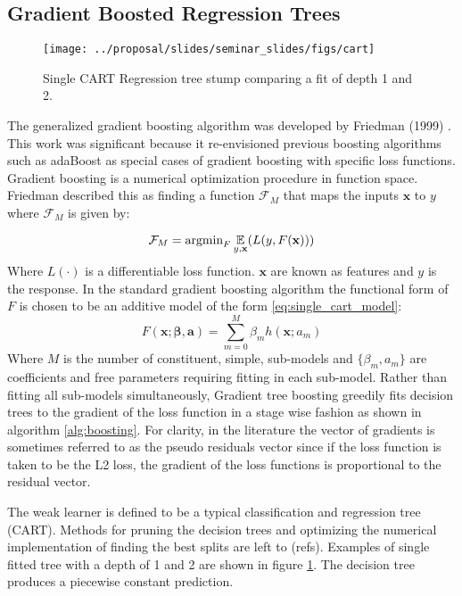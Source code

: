 \subsection{Gradient Boosted Regression Trees}

\begin{figure}[H]
    \centering
    \texttt{[image: ../proposal/slides/seminar\_slides/figs/cart]}
    \caption[Regression tree stump.]{Single CART Regression tree stump comparing a fit of depth 1 and 2.}
    \label{fig:cart}
\end{figure}

The generalized gradient boosting algorithm was developed by Friedman (1999)  \cite{friedman2001}.  This work was significant because it re-envisioned previous boosting algorithms such as adaBoost as special cases of gradient boosting with specific loss functions.  Gradient boosting is a numerical optimization procedure in function space.  Friedman described this as finding a function $\mathcal F_M$ that maps the inputs $\mathbf x$ to $y$ where $\mathcal F_M$ is given by:

\begin{equation}
\mathcal F_M = \text{argmin}_F \operatorname*{\mathbb{E}}_{y, \mathbf x} (L(y, F(\mathbf x)))
\end{equation}
Where $L(\cdot)$ is a differentiable loss function.  $\mathbf x$ are known as features and $y$ is the response.  In the standard gradient boosting algorithm the functional form of $F$ is chosen to be an additive model of the form \ref{eq:single_cart_model}:
\begin{equation}
F(\mathbf x; \mathbf{\beta}, \mathbf a) = \sum_{m=0}^M \beta_m h(\mathbf x; a_m)
\label{eq:single_cart_model}
\end{equation} 
Where $M$ is the number of constituent, simple, sub-models and $\{ \beta_m, a_m\}$ are coefficients and free parameters requiring fitting in each sub-model.
Rather than fitting all sub-models simultaneously, 
Gradient tree boosting greedily fits decision trees to the gradient of the loss function in a stage wise fashion as shown in algorithm \ref{alg:boosting}.  For clarity, in the literature the vector of gradients is sometimes referred to as the pseudo residuals vector since if the loss function is taken to be the L2 loss, the gradient of the loss functions is proportional to the residual vector.  

The  weak learner is defined to be a typical classification and regression tree (CART).  Methods for pruning the decision trees and optimizing the numerical implementation of finding the best splits are left to (refs).  Examples of single fitted tree with a depth of 1 and 2 are shown in figure \ref{fig:cart}.  The decision tree produces a piecewise constant prediction.

